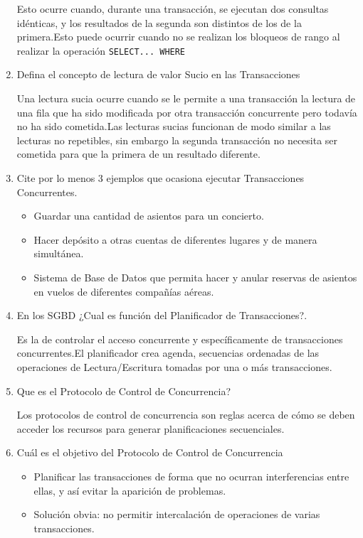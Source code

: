\begin{enumerate}
Esto ocurre cuando, durante una transacción, se ejecutan dos consultas idénticas, y los resultados de la segunda son distintos de los de la primera.Esto puede ocurrir cuando no se realizan los bloqueos de rango al realizar la operación \texttt{SELECT... WHERE}

\item  Defina el concepto de lectura de valor Sucio en las Transacciones

Una lectura sucia ocurre cuando se le permite a una transacción la lectura de una fila que ha sido modificada por otra transacción concurrente pero todavía no ha sido cometida.Las lecturas sucias funcionan de modo similar a las lecturas no repetibles, sin embargo la segunda transacción no necesita ser cometida para que la primera de un resultado diferente.

\item  Cite por lo menos 3 ejemplos que ocasiona ejecutar Transacciones Concurrentes.

\begin{itemize}
\item Guardar una cantidad de asientos para un concierto.
\item Hacer depósito a otras cuentas de diferentes lugares y de manera simultánea.
\item Sistema de Base de Datos que permita hacer y anular reservas de asientos en vuelos de diferentes compañías aéreas.
\end{itemize}

\item En los SGBD ¿Cual es función del Planificador de Transacciones?.

Es la de controlar el acceso concurrente y específicamente de transacciones concurrentes.El planificador crea agenda, secuencias ordenadas de las operaciones de Lectura/Escritura tomadas por una o más transacciones.

\item Que es el Protocolo de Control de Concurrencia?

Los protocolos de control de concurrencia son reglas acerca de cómo se deben acceder los recursos para generar planificaciones secuenciales.

\item Cuál es el objetivo del Protocolo de Control de Concurrencia

\begin{itemize}
\item Planificar las transacciones de forma que no ocurran interferencias entre ellas, y así evitar la aparición de problemas.
\item Solución obvia: no permitir intercalación de operaciones de varias transacciones.
\end{itemize}


\end{enumerate}
